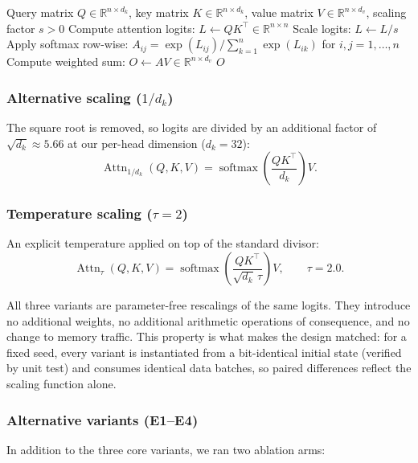 \documentclass[10pt,a4paper]{article}
\begin{document}
\begin{algorithm}[t]
\caption{Scaled Dot-Product Attention with scaling factor $s$}
\label{alg:attn}
\begin{algorithmic}[1]
\REQUIRE Query matrix $Q \in \mathbb{R}^{n \times d_k}$, key matrix $K \in \mathbb{R}^{n \times d_k}$, value matrix $V \in \mathbb{R}^{n \times d_v}$, scaling factor $s > 0$
\STATE Compute attention logits: $L \leftarrow QK^{\top} \in \mathbb{R}^{n \times n}$
\STATE Scale logits: $L \leftarrow L / s$
\STATE Apply softmax row-wise: $A_{ij} = \exp(L_{ij}) / \sum_{k=1}^{n} \exp(L_{ik})$ for $i,j = 1,\dots,n$
\STATE Compute weighted sum: $O \leftarrow AV \in \mathbb{R}^{n \times d_v}$
\RETURN $O$
\end{algorithmic}
\end{algorithm}

\subsubsection{Alternative scaling ($1/d_k$)}
The square root is removed, so logits are divided by an additional factor of $\sqrt{d_k} \approx 5.66$ at our per-head dimension ($d_k = 32$):
\begin{equation}\label{eq:dk}
  \operatorname{Attn}_{1/d_k}(Q,K,V)
    = \operatorname{softmax}\!\left(\frac{QK^{\top}}{d_k}\right)V .
\end{equation}

\subsubsection{Temperature scaling ($\tau = 2$)}
An explicit temperature applied on top of the standard divisor:
\begin{equation}\label{eq:temp}
  \operatorname{Attn}_{\tau}(Q,K,V)
    = \operatorname{softmax}\!\left(\frac{QK^{\top}}{\sqrt{d_k}\,\tau}\right)V,
    \qquad \tau = 2.0 .
\end{equation}

All three variants are parameter-free rescalings of the same logits. They introduce no additional weights, no additional arithmetic operations of consequence, and no change to memory traffic. This property is what makes the design matched: for a fixed seed, every variant is instantiated from a bit-identical initial state (verified by unit test) and consumes identical data batches, so paired differences reflect the scaling function alone.

\subsubsection{Alternative variants (E1--E4)}
In addition to the three core variants, we ran two ablation arms:
\end{document}
